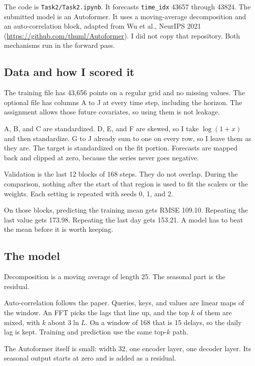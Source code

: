 \documentclass[11pt,a4paper]{article}
\begin{document}
The code is \texttt{Task2/Task2.ipynb}. It forecasts \texttt{time\_idx} 43657 through 43824. The submitted model is an Autoformer. It uses a moving-average decomposition and an auto-correlation block, adapted from Wu et al., NeurIPS 2021 (\url{https://github.com/thuml/Autoformer}). I did not copy that repository. Both mechanisms run in the forward pass.

\subsection*{Data and how I scored it}

The training file has 43,656 points on a regular grid and no missing values. The optional file has columns A to J at every time step, including the horizon. The assignment allows those future covariates, so using them is not leakage.

A, B, and C are standardized. D, E, and F are skewed, so I take $\log(1+x)$ and then standardize. G to J already sum to one on every row, so I leave them as they are. The target is standardized on the fit portion. Forecasts are mapped back and clipped at zero, because the series never goes negative.

Validation is the last 12 blocks of 168 steps. They do not overlap. During the comparison, nothing after the start of that region is used to fit the scalers or the weights. Each setting is repeated with seeds 0, 1, and 2.

On those blocks, predicting the training mean gets RMSE 109.10. Repeating the last value gets 173.98. Repeating the last day gets 153.21. A model has to beat the mean before it is worth keeping.

\subsection*{The model}

Decomposition is a moving average of length 25. The seasonal part is the residual.

Auto-correlation follows the paper. Queries, keys, and values are linear maps of the window. An FFT picks the lags that line up, and the top $k$ of them are mixed, with $k$ about $3\ln L$. On a window of 168 that is 15 delays, so the daily lag is kept. Training and prediction use the same top-$k$ path.

The Autoformer itself is small: width 32, one encoder layer, one decoder layer. Its seasonal output starts at zero and is added as a residual.
\end{document}
